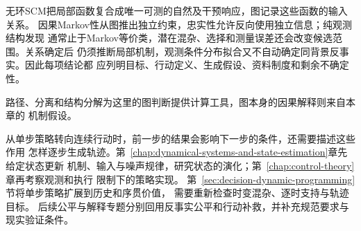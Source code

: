 无环SCM把局部函数复合成唯一可测的自然及干预响应，图记录这些函数的输入关系。
因果Markov性从图推出独立约束，忠实性允许反向使用独立信息；纯观测结构发现
通常止于Markov等价类，潜在混杂、选择和测量误差还会改变候选范围。关系确定后
仍须推断局部机制，观测条件分布拟合又不自动确定同背景反事实。因此每项结论都
应列明目标、行动定义、生成假设、资料制度和剩余不确定性。

路径、分离和结构分解为这里的图判断提供计算工具，图本身的因果解释则来自本章的
机制假设。

从单步策略转向连续行动时，前一步的结果会影响下一步的条件，还需要描述这些作用
怎样逐步生成轨迹。第~\ref{chap:dynamical-systems-and-state-estimation}章先给定状态更新
机制、输入与噪声规律，研究状态的演化；第~\ref{chap:control-theory}章再考察观测和执行
限制下的策略实现。
第~\ref{sec:decision-dynamic-programming}节将单步策略扩展到历史和序贯价值，
需要重新检查时变混杂、逐时支持与轨迹目标。
后续公平与解释专题分别回用反事实公平和行动补救，并补充规范要求与现实验证条件。
